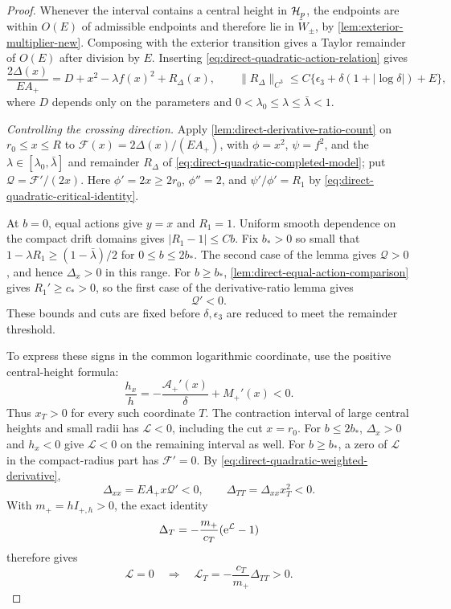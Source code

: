 \begin{proof}
Whenever the interval contains a central height in \(\mathcal H_p\), the
endpoints are within \(O(E)\) of admissible endpoints and therefore
lie in \(\widetilde W_\pm\), by \cref{lem:exterior-multiplier-new}.
Composing with the exterior transition gives a Taylor remainder of
\(O(E)\) after division by \(E\). Inserting
\eqref{eq:direct-quadratic-action-relation} gives
\begin{equation}
\label{eq:direct-quadratic-completed-model}
 \frac{2\Delta(x)}{EA_+}
 =D+x^2-\lambda f(x)^2+R_\Delta(x),\qquad
 \|R_\Delta\|_{C^3}
       \le C\{\epsilon_3+\delta(1+|\log\delta|)+E\},
\end{equation}
where \(D\) depends only on the parameters and
\(0<\lambda_0\le\lambda\le\bar\lambda<1\).

\emph{Controlling the crossing direction.}
Apply \cref{lem:direct-derivative-ratio-count} on \(r_0\le x\le R\) to
\(\mathcal F(x)=2\Delta(x)/(EA_+)\), with \(\phi=x^2\), \(\psi=f^2\),
and the \(\lambda\in[\lambda_0,\bar\lambda]\) and remainder
\(R_\Delta\) of \eqref{eq:direct-quadratic-completed-model}; put
\(\mathscr Q=\mathcal F'/(2x)\). Here \(\phi'=2x\ge2r_0\),
\(\phi''=2\), and \(\psi'/\phi'=R_1\) by
\eqref{eq:direct-quadratic-critical-identity}.

At \(b=0\), equal actions give \(y=x\) and \(R_1=1\).
Uniform smooth dependence on the compact drift domains gives
\(|R_1-1|\le Cb\). Fix \(b_*>0\) so small that
\(1-\lambda R_1\ge(1-\bar\lambda)/2\) for \(0\le b\le2b_*\).
The second case of the lemma gives \(\mathscr Q>0\), and hence
\(\Delta_x>0\) in this range. For \(b\ge b_*\),
\cref{lem:direct-equal-action-comparison} gives \(R_1'\ge c_*>0\),
so the first case of the derivative-ratio lemma gives
\begin{equation}
\label{eq:direct-quadratic-weighted-derivative}
 \mathscr Q'<0 .
\end{equation}
These bounds and cuts are fixed before \(\delta,\epsilon_3\) are reduced
to meet the remainder threshold.

To express these signs in the common logarithmic coordinate, use the
positive central-height formula:
\[
 \frac{h_x}{h}=-\frac{\mathcal A_+'(x)}\delta+M_+'(x)<0.
\]
Thus \(x_T>0\) for every such coordinate \(T\). The contraction
interval of large central heights and small radii has
\(\mathcal L<0\), including the cut \(x=r_0\). For \(b\le2b_*\),
\(\Delta_x>0\) and \(h_x<0\) give \(\mathcal L<0\) on the
remaining interval as well. For \(b\ge b_*\), a zero of
\(\mathcal L\) in the compact-radius part has \(\mathcal F'=0\).
By \eqref{eq:direct-quadratic-weighted-derivative},
\[
 \Delta_{xx}=EA_+x\mathscr Q'<0,\qquad
 \Delta_{TT}=\Delta_{xx}x_T^2<0.
\]
With \(m_+=hI_{+,h}>0\), the exact identity
\[
 \Delta_T=-\frac{m_+}{c_T}(\mathrm e^{\mathcal L}-1)
\]
therefore gives
\begin{equation}
\label{eq:direct-quadratic-prefix-zero-orientation}
 \mathcal L=0\quad\Longrightarrow\quad
 \mathcal L_T=-\frac{c_T}{m_+}\Delta_{TT}>0.
\end{equation}


\end{proof}
